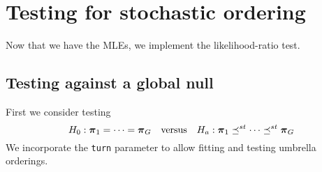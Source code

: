 \documentclass[reqno]{amsart}
\newcommand{\bpi}{\text{\boldmath $\pi$}}
\newcommand{\leqst}{\mathrel{\preceq^{st}}}
\begin{document}
\section{Testing for stochastic ordering}

Now that we have the MLEs, we implement the likelihood-ratio test. 

\subsection{Testing against a global null}
First  we consider testing
\begin{equation*}
H_0: \bpi_1=\cdots =\bpi_G \quad\text{versus}\quad
H_a:\bpi_1 \leqst \cdots \leqst \bpi_G
\end{equation*}
We incorporate the \texttt{turn} parameter to allow fitting and testing umbrella orderings.
\end{document}
